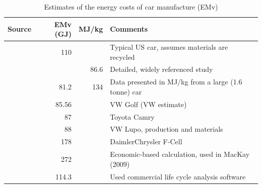 \begin{table}[h]
\caption{Estimates of the energy costs of car manufacture (EMv)}
\begin{center}
 \begin{tabular}{p{3cm}rrp{6cm}}
 \toprule
 Source	& EMv (GJ)	&MJ/kg	&Comments\\
  \midrule
\citet{burnham2006development}	&110	&	&Typical US car, assumes materials are recycled\\
\citet{MacLean1998}	&	&86.6	&Detailed, widely referenced study\\
\citet{Mikkola201023}		&81.2	&134&Data presented in MJ/kg from a large (1.6 tonne) car\\
\citet{Simonsen2011}	&85.56	&	&VW Golf (VW estimate)\\
\citet{sorensen2004total}	&87	&	&Toyota Camry\\
\citet{sorensen2004total}	&88	&	&VW Lupo, production and materials\\
\citet{sorensen2004total}	&178	&	&DaimlerChrysler F-Cell\\
\citet{Treloar2004}	&272	&	&Economic-based calculation, used in MacKay (2009)\\
\citet{Uson2011-eco-eff}	&114.3	&	&Used commercial life cycle analysis software\\
\bottomrule
 \end{tabular}\end{center}
 \label{tcaren}
\end{table}


